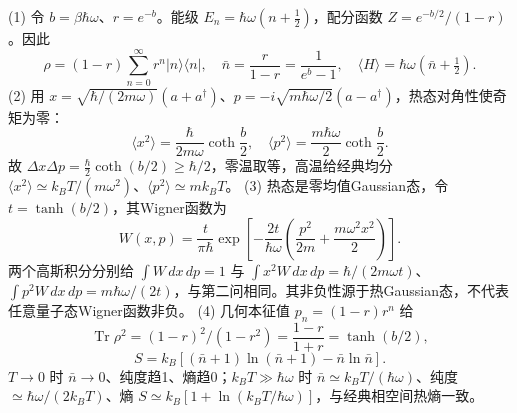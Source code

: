 (1) 令 \(b=\beta\hbar\omega\)、\(r=e^{-b}\)。能级 \(E_n=\hbar\omega(n+\tfrac12)\)，配分函数 \(Z=e^{-b/2}/(1-r)\)。因此
\[
\rho=(1-r)\sum_{n=0}^\infty r^n|n\rangle\langle n|,\quad
\bar n=\frac r{1-r}=\frac1{e^b-1},\quad \langle H\rangle=\hbar\omega(\bar n+\tfrac12).
\]
(2) 用 \(x=\sqrt{\hbar/(2m\omega)}(a+a^\dagger)\)、\(p=-i\sqrt{m\hbar\omega/2}(a-a^\dagger)\)，热态对角性使奇矩为零：
\[
\langle x^2\rangle=\frac{\hbar}{2m\omega}\coth\frac b2,\quad
\langle p^2\rangle=\frac{m\hbar\omega}{2}\coth\frac b2.
\]
故 \(\Delta x\Delta p=\frac\hbar2\coth(b/2)\ge\hbar/2\)，零温取等，高温给经典均分 \(\langle x^2\rangle\simeq k_BT/(m\omega^2)\)、\(\langle p^2\rangle\simeq mk_BT\)。
(3) 热态是零均值Gaussian态，令 \(t=\tanh(b/2)\)，其Wigner函数为
\[
W(x,p)=\frac{t}{\pi\hbar}\exp\left[-\frac{2t}{\hbar\omega}\left(\frac{p^2}{2m}+\frac{m\omega^2x^2}{2}\right)\right].
\]
两个高斯积分分别给 \(\int W\,dx\,dp=1\) 与 \(\int x^2W\,dx\,dp=\hbar/(2m\omega t)\)、\(\int p^2W\,dx\,dp=m\hbar\omega/(2t)\)，与第二问相同。其非负性源于热Gaussian态，不代表任意量子态Wigner函数非负。
(4) 几何本征值 \(p_n=(1-r)r^n\) 给
\[
\operatorname{Tr}\rho^2=(1-r)^2/(1-r^2)=\frac{1-r}{1+r}=\tanh(b/2),
\]
\[
S=k_B[(\bar n+1)\ln(\bar n+1)-\bar n\ln\bar n].
\]
\(T\to0\) 时 \(\bar n\to0\)、纯度趋1、熵趋0；\(k_BT\gg\hbar\omega\) 时 \(\bar n\simeq k_BT/(\hbar\omega)\)、纯度 \(\simeq\hbar\omega/(2k_BT)\)、熵 \(S\simeq k_B[1+\ln(k_BT/\hbar\omega)]\)，与经典相空间热熵一致。
